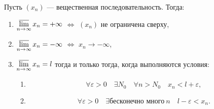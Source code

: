 \hypertarget{техническое описание верхнего предела}{}
\begin{theorem}
	Пусть \((x_n)\) --- вещественная последовательность. Тогда:
	\begin{enumerate}
		\item \(\varlimsup\limits_{n \to \infty} x_n = +\infty\) \(\Leftrightarrow\) \((x_n)\) не ограничена сверху,
		\item \(\varlimsup\limits_{n \to \infty} x_n = -\infty\) \(\Leftrightarrow\) \(x_n \to -\infty\),
		\item \(\varlimsup\limits_{n \to \infty} x_n = l\) тогда и только тогда, когда выполняются условия:
		\begin{enumerate}
			\item \[
				\forall \varepsilon > 0 \quad \exists N_0 \quad \forall n > N_0 \quad x_n < l + \varepsilon,
			\]
			\item \[
				\forall \varepsilon > 0 \quad \exists \textit{бесконечно много} \ n \quad l - \varepsilon < x_n.
			\]
		\end{enumerate}
	\end{enumerate}
\end{theorem}

